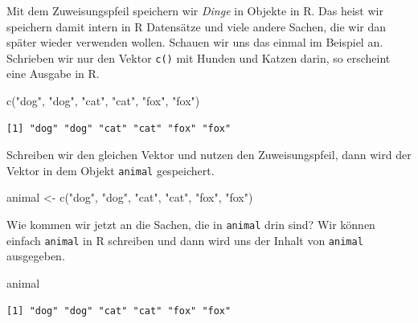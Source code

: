 \documentclass[
  letterpaper,
]{scrbook}
\newenvironment{Shaded}{\begin{snugshade}}{\end{snugshade}}
\newcommand{\FunctionTok}[1]{\textcolor[rgb]{0.28,0.35,0.67}{#1}}
\newcommand{\NormalTok}[1]{\textcolor[rgb]{0.00,0.23,0.31}{#1}}
\newcommand{\OtherTok}[1]{\textcolor[rgb]{0.00,0.23,0.31}{#1}}
\newcommand{\StringTok}[1]{\textcolor[rgb]{0.13,0.47,0.30}{#1}}
\begin{document}
Mit dem Zuweisungspfeil speichern wir \emph{Dinge} in Objekte in R. Das
heist wir speichern damit intern in R Datensätze und viele andere
Sachen, die wir dan später wieder verwenden wollen. Schauen wir uns das
einmal im Beispiel an. Schrieben wir nur den Vektor \texttt{c()} mit
Hunden und Katzen darin, so erscheint eine Ausgabe in R.

\begin{Shaded}
\begin{Highlighting}[]
\FunctionTok{c}\NormalTok{(}\StringTok{"dog"}\NormalTok{, }\StringTok{"dog"}\NormalTok{, }\StringTok{"cat"}\NormalTok{, }\StringTok{"cat"}\NormalTok{, }\StringTok{"fox"}\NormalTok{, }\StringTok{"fox"}\NormalTok{)}
\end{Highlighting}
\end{Shaded}

\begin{verbatim}
[1] "dog" "dog" "cat" "cat" "fox" "fox"
\end{verbatim}

Schreiben wir den gleichen Vektor und nutzen den Zuweisungspfeil, dann
wird der Vektor in dem Objekt \texttt{animal} gespeichert.

\begin{Shaded}
\begin{Highlighting}[]
\NormalTok{animal }\OtherTok{\textless{}{-}} \FunctionTok{c}\NormalTok{(}\StringTok{"dog"}\NormalTok{, }\StringTok{"dog"}\NormalTok{, }\StringTok{"cat"}\NormalTok{, }\StringTok{"cat"}\NormalTok{, }\StringTok{"fox"}\NormalTok{, }\StringTok{"fox"}\NormalTok{)}
\end{Highlighting}
\end{Shaded}

Wie kommen wir jetzt an die Sachen, die in \texttt{animal} drin sind?
Wir können einfach \texttt{animal} in R schreiben und dann wird uns der
Inhalt von \texttt{animal} ausgegeben.

\begin{Shaded}
\begin{Highlighting}[]
\NormalTok{animal}
\end{Highlighting}
\end{Shaded}

\begin{verbatim}
[1] "dog" "dog" "cat" "cat" "fox" "fox"
\end{verbatim}

{}
\end{document}
